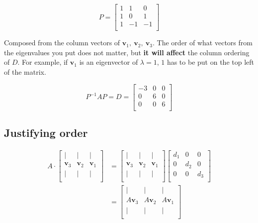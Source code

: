 \documentclass[
]{article}
\newcounter{example}
\begin{document}
$$P = \begin{bmatrix}
1 & 1 & 0 \\
1 & 0 & 1 \\
1 & - 1 & - 1 \\
\end{bmatrix}$$

Composed from the column vectors of
${\mathbf{v}}_{1},\ {\mathbf{v}}_{2},\ {\mathbf{v}}_{3}$.
The order of what vectors from the eigenvalues you put does not matter,
but \textbf{it will affect} the column ordering of $D$. For example,
if ${\mathbf{v}}_{1}$ is an eigenvector of $\lambda = 1$, $1$
has to be put on the top left of the matrix.

$$P^{- 1}AP = D = \begin{bmatrix}
 - 3 & 0 & 0 \\
0 & 6 & 0 \\
0 & 0 & 6 \\
\end{bmatrix}$$


\subsection{\texorpdfstring{ Justifying
order}{ Justifying order}}

\begin{align*}
A \cdot \begin{bmatrix}
 \mid & \mid & \mid \\
{\mathbf{v}}_{3} & {\mathbf{v}}_{2} & {\mathbf{v}}_{1} \\
 \mid & \mid & \mid \\
\end{bmatrix} &= \begin{bmatrix}
 \mid & \mid & \mid \\
{\mathbf{v}}_{3} & {\mathbf{v}}_{2} & {\mathbf{v}}_{1} \\
 \mid & \mid & \mid \\
\end{bmatrix}\begin{bmatrix}
d_{1} & 0 & 0 \\
0 & d_{2} & 0 \\
0 & 0 & d_{3} \\
\end{bmatrix}  \\
&= \begin{bmatrix}
 \mid & \mid & \mid \\
{A\mathbf{v}}_{3} & A{\mathbf{v}}_{2} & A{\mathbf{v}}_{1} \\
 \mid & \mid & \mid \\
\end{bmatrix}
\end{align*}
\end{document}
